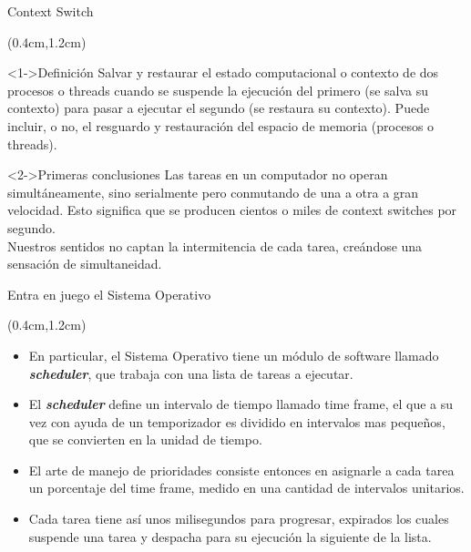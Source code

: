\begin{frame}{Context Switch}
 \begin{textblock*}{\textwidth}(0.4cm,1.2cm)
  \begin{block}<1->{Definición} \justifying
Salvar y restaurar el estado computacional o contexto de dos procesos o threads cuando se suspende la ejecución del primero (se salva su contexto) para pasar a ejecutar el segundo (se restaura su contexto). Puede incluir, o no, el resguardo y restauración del espacio de memoria (procesos o threads).
  \end{block}

  \begin{block}<2->{Primeras conclusiones} \justifying
Las tareas en un computador no operan simultáneamente, sino serialmente pero conmutando de una a otra a gran velocidad. Esto significa que se producen cientos o miles de context switches por segundo.\\
Nuestros sentidos no captan la intermitencia de cada tarea, creándose una sensación de simultaneidad.\\
  \end{block}
 \end{textblock*}
\end{frame}

\begin{frame}{Entra en juego el Sistema Operativo}
 \begin{textblock*}{\textwidth}(0.4cm,1.2cm)
  \begin{itemize}[<+(1)->] \justifying \parskip 0.3cm
   \item En particular, el Sistema Operativo tiene un módulo de software llamado \textbf{\textit{scheduler}}, que trabaja con una lista de tareas a ejecutar.
   \item El \textbf{\textit{scheduler}} define un intervalo de tiempo llamado time frame, el que a su vez con ayuda de un temporizador es dividido en intervalos mas pequeños, que se convierten en la unidad de tiempo.
   \item El arte de manejo de prioridades consiste entonces en asignarle a cada tarea un porcentaje del time frame, medido en una cantidad de intervalos unitarios.
   \item Cada tarea tiene así unos milisegundos para progresar, expirados los cuales suspende una tarea y despacha para su ejecución la siguiente de la lista.
  \end{itemize}
 \end{textblock*}
\end{frame}

